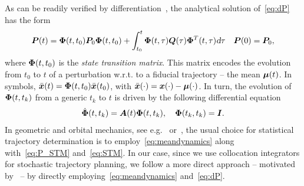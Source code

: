 As can be readily verified by differentiation~\cite{Gajic:LyapunovMatrixEquation:2010}, the analytical solution of~\eqref{eq:dP} has the form
\begin{align}\label{eq:P_STM}
\bP(t) = \bPhi(t,t_0) \bP_0 \bPhi(t,t_0)+\int_{t_0}^{t} \bPhi(t,\tau) \bQ(\tau) \bPhi^T(t,\tau) \dd \tau \quad \bP(0)=\bP_0,
\end{align}
where $\boldsymbol{\Phi}(t,t_0)$ is the \emph{state transition matrix}. This matrix encodes the evolution from $t_0$ to $t$ of a perturbation w.r.t. to a fiducial trajectory -- the mean $\boldsymbol{\mu}(t)$. In symbols, $\bar{\boldsymbol{x}}(t) = \boldsymbol{\Phi}(t,t_0) \bar{\boldsymbol{x}}(t_0)$, with $\bar{\boldsymbol{x}}(\cdot) =\boldsymbol{x}(\cdot) - \boldsymbol{\mu}(\cdot) $. In turn, the evolution of $\boldsymbol{\Phi}(t,t_k)$ from a generic $t_k$ to $t$ is driven by the following differential equation
\begin{align}\label{eq:STM}
\dbPhi(t,t_k) = \bA(t)\bPhi(t,t_k), \quad \bPhi(t_k, t_k) = \bI.
\end{align}
In geometric and orbital mechanics, see e.g.~\cite{Maruskin:DynamicalSystemsGeometric:2018} or~\cite{Tapley:StatisticalOrbitDetermination:2004}, the usual choice for statistical trajectory determination is to employ~\eqref{eq:meandynamics} along with~\eqref{eq:P_STM} and~\eqref{eq:STM}. In our case, since we use collocation integrators for stochastic trajectory planning, we follow a more direct approach -- motivated by~\cite{Gillis:PracticalMethodsApproximate:2015} -- by directly employing~\eqref{eq:meandynamics} and~\eqref{eq:dP}.

